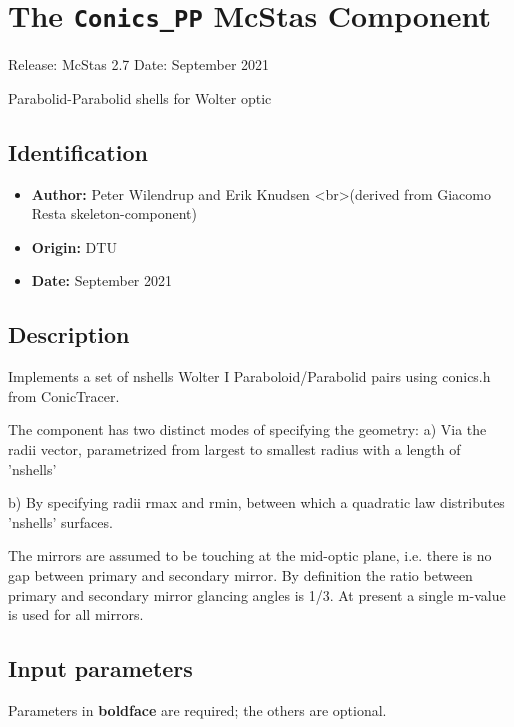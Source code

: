 \section{The \texttt{Conics\_PP} McStas Component}
Release: McStas 2.7
Date: September 2021

Parabolid-Parabolid shells for Wolter optic

\subsection*{Identification}
\begin{itemize}
  \item \textbf{Author:} Peter Wilendrup and Erik Knudsen \textless{}br\textgreater{}(derived from Giacomo Resta skeleton-component)
  \item \textbf{Origin:} DTU
  \item \textbf{Date:} September 2021
\end{itemize}

\subsection*{Description}
Implements a set of nshells Wolter I Paraboloid/Parabolid pairs using conics.h from ConicTracer.

The component has two distinct modes of specifying the geometry: a) Via the radii vector, parametrized from largest to smallest radius with a length of 'nshells'

b) By specifying radii rmax and rmin, between which a quadratic law distributes 'nshells' surfaces.

The mirrors are assumed to be touching at the mid-optic plane, i.e. there is no gap between primary and secondary mirror. By definition the ratio between primary and secondary mirror glancing angles is 1/3. At present a single m-value is used for all mirrors.

\subsection*{Input parameters}
Parameters in \textbf{boldface} are required; the others are optional.

